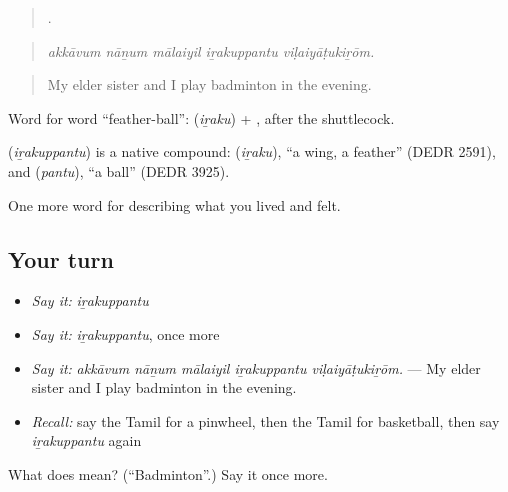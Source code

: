 \begin{quote}
    .
\end{quote}

\begin{quote}
\emph{akkāvum nāṉum mālaiyil iṟakuppantu viḷaiyāṭukiṟōm.}
\end{quote}

\begin{quote}
My elder sister and I play badminton in the evening.
\end{quote}

Word for word \textquotedblleft{}feather-ball\textquotedblright{}:  (\emph{iṟaku}) + , after the shuttlecock.

\begin{cousinweb}
\textbf{} (\emph{iṟakuppantu}) is a native compound:  (\emph{iṟaku}), \textquotedblleft{}a wing, a feather\textquotedblright{} (DEDR 2591), and  (\emph{pantu}), \textquotedblleft{}a ball\textquotedblright{} (DEDR 3925).
\end{cousinweb}

\begin{grammarlens}[title={What you've built}]
One more word for describing what you lived and felt.
\end{grammarlens}

\subsection*{Your turn}
\begin{itemize}
\raggedright
  \item \emph{Say it:} \emph{iṟakuppantu}
  \item \emph{Say it:} \emph{iṟakuppantu}, once more
  \item \emph{Say it:} \emph{akkāvum nāṉum mālaiyil iṟakuppantu viḷaiyāṭukiṟōm.} — My elder sister and I play badminton in the evening.
  \item \emph{Recall:} say the Tamil for a pinwheel, then the Tamil for basketball, then say \emph{iṟakuppantu} again
\end{itemize}

\begin{tcolorbox}[breakable,colback=teal!4,colframe=teal!35!black,title={Before you move on}]
What does  mean? (\textquotedblleft{}Badminton\textquotedblright{}.) Say it once more.
\end{tcolorbox}
